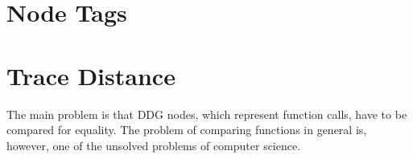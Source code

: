 \section{Node Tags}

\section{Trace Distance}
The main problem is that DDG nodes, which represent function calls, have to be compared for equality. The problem of comparing functions in general is, however, one of the unsolved problems of computer science. 







